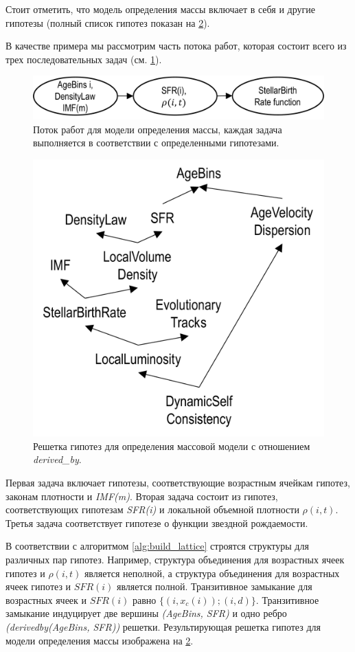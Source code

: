 Стоит отметить, что модель определения массы включает в себя и другие гипотезы 
(полный список гипотез показан на \cref{fig:BGM_lattice}).

В качестве примера мы рассмотрим часть потока работ, которая состоит всего из 
трех последовательных задач (см. \cref{fig:BGM_workflow}). 


\begin{figure}[h!]
    \centering
    \includegraphics[width=0.7\linewidth]{images/BGM_workflow.pdf}
    \caption{Поток работ для модели определения массы, каждая задача выполняется 
            в соответствии с определенными гипотезами.}\label{fig:BGM_workflow}
\end{figure}

\begin{figure}[ht]
    \centering
    \includegraphics[width=0.6\linewidth]{images/BGM_lattice.pdf}
    \caption{Решетка гипотез  для определения массовой модели с отношением \textit{derived\_by}.}\label{fig:BGM_lattice}
\end{figure}

Первая задача включает гипотезы, соответствующие возрастным ячейкам гипотез, законам плотности и \textit{IMF(m)}. 
Вторая задача состоит из гипотез, соответствующих гипотезам \textit{SFR(i)} и локальной объемной плотности 
$\rho(i, t)$. Третья задача соответствует гипотезе о функции звездной рождаемости.

В соответствии с алгоритмом \ref{alg:build_lattice} строятся структуры для различных пар гипотез. Например, структура 
объединения для возрастных ячеек гипотез и $\rho(i, t)$ является неполной, а структура объединения для возрастных 
ячеек гипотез и $SFR(i)$ является полной. Транзитивное замыкание для возрастных ячеек и $SFR(i)$ 
равно $\{(i, x_c(i)); (i, d)\}$. Транзитивное замыкание индуцирует две вершины \textit{(AgeBins, SFR)} 
и одно ребро \textit{(derived\textunderscore by(AgeBins, SFR))} решетки. Результирующая решетка гипотез 
для модели определения массы изображена на \cref{fig:BGM_lattice}.

